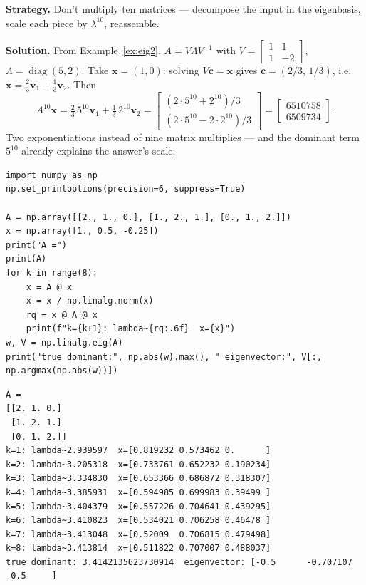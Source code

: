 \begin{example}\label{ex:a10}
\textbf{Strategy.} Don't multiply ten matrices --- decompose the input in
the eigenbasis, scale each piece by $\lambda^{10}$, reassemble.

\textbf{Solution.} From Example~\ref{ex:eig2},
$A=V\Lambda V^{-1}$ with $V=\begin{bmatrix}1&1\\1&-2\end{bmatrix}$,
$\Lambda=\operatorname{diag}(5,2)$. Take $\mathbf x=(1,0)$: solving
$V\mathbf c=\mathbf x$ gives $\mathbf c=(2/3,\,1/3)$, i.e.
$\mathbf x=\tfrac23\mathbf v_1+\tfrac13\mathbf v_2$. Then
\[
A^{10}\mathbf x=\tfrac23\,5^{10}\mathbf v_1+\tfrac13\,2^{10}\mathbf v_2
=\begin{bmatrix}(2\cdot5^{10}+2^{10})/3\\(2\cdot5^{10}-2\cdot2^{10})/3\end{bmatrix}
=\begin{bmatrix}6510758\\6509734\end{bmatrix}.
\]
Two exponentiations instead of nine matrix multiplies --- and the dominant
term $5^{10}$ already explains the answer's scale.
\end{example}

\begin{lstlisting}[caption={\ttfamily code/ch07\_power\_iteration.py ---
eight steps of power iteration: multiply, normalize, read the Rayleigh
quotient.}]
import numpy as np
np.set_printoptions(precision=6, suppress=True)

A = np.array([[2., 1., 0.], [1., 2., 1.], [0., 1., 2.]])
x = np.array([1., 0.5, -0.25])
print("A =")
print(A)
for k in range(8):
    x = A @ x
    x = x / np.linalg.norm(x)
    rq = x @ A @ x
    print(f"k={k+1}: lambda~{rq:.6f}  x={x}")
w, V = np.linalg.eig(A)
print("true dominant:", np.abs(w).max(), " eigenvector:", V[:, np.argmax(np.abs(w))])
\end{lstlisting}

\begin{lstlisting}[caption={Output of power iteration. Notice the iterate
rotates onto the dominant eigendirection and the Rayleigh quotient locks
onto $\lambda_1=2+\sqrt2\approx3.4142$ --- the sign flip versus
\texttt{np.linalg.eig} is the up-to-scale freedom, not an error.}]
A =
[[2. 1. 0.]
 [1. 2. 1.]
 [0. 1. 2.]]
k=1: lambda~2.939597  x=[0.819232 0.573462 0.      ]
k=2: lambda~3.205318  x=[0.733761 0.652232 0.190234]
k=3: lambda~3.334830  x=[0.653366 0.686872 0.318307]
k=4: lambda~3.385931  x=[0.594985 0.699983 0.39499 ]
k=5: lambda~3.404379  x=[0.557226 0.704641 0.439295]
k=6: lambda~3.410823  x=[0.534021 0.706258 0.46478 ]
k=7: lambda~3.413048  x=[0.52009  0.706815 0.479498]
k=8: lambda~3.413814  x=[0.511822 0.707007 0.488037]
true dominant: 3.4142135623730914  eigenvector: [-0.5      -0.707107 -0.5     ]
\end{lstlisting}

